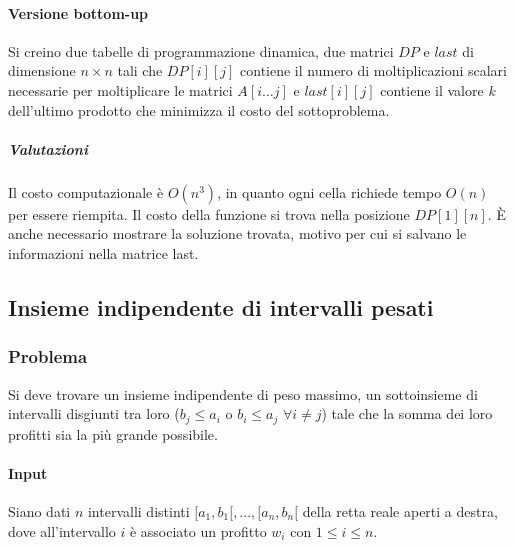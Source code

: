 \paragraph{Versione bottom-up}
Si creino due tabelle di programmazione dinamica, due matrici $DP$ e $last$ di dimensione $n\times n$ tali che $DP[i][j]$ contiene il numero di moltiplicazioni scalari necessarie per 
moltiplicare le matrici $A[i\dots j]$ e $last[i][j]$ contiene il valore $k$ dell'ultimo prodotto che minimizza il costo del sottoproblema.\\

\subparagraph{Valutazioni}
Il costo computazionale \`e $O(n^3)$, in quanto ogni cella richiede tempo $O(n)$ per essere riempita. Il costo della funzione si trova nella posizione $DP[1][n]$. \`E anche necessario
mostrare la soluzione trovata, motivo per cui si salvano le informazioni nella matrice last.\\ 



\subsection{Insieme indipendente di intervalli pesati}
\subsubsection{Problema}
Si deve trovare un insieme indipendente di peso massimo, un sottoinsieme di intervalli disgiunti tra loro ($b_j \le a_i$ o $b_i\le a_j$ $\forall i\neq j$) tale che la somma dei loro 
profitti sia la pi\`u grande possibile.
\paragraph{Input}
Siano dati $n$ intervalli distinti $[a_1, b_1[, \dots, [a_n, b_n[$ della retta reale aperti a destra, dove all'intervallo $i$ \`e associato un profitto $w_i$ con $1\le i\le n$.
